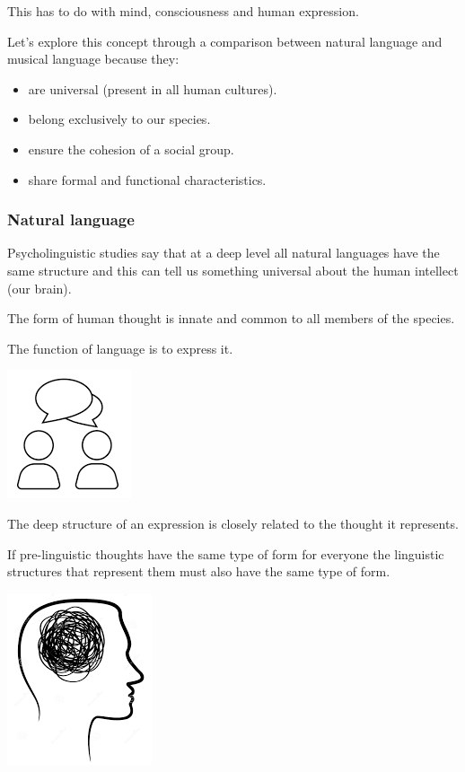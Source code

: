 This has to do with mind, consciousness and human expression.

Let's explore this concept through a comparison between natural language and musical language because they: 
\begin{itemize}
\item are universal (present in all human cultures). 
\item belong exclusively to our species. 
\item ensure the cohesion of a social group. 
\item share formal and functional characteristics.
\end{itemize}

\subsubsection{Natural language}\label{natural-language}

Psycholinguistic studies say that at a deep level all natural languages have the same structure and this can tell us something universal about the human intellect (our brain).

The form of human thought is innate and common to all members of the species.

The function of language is to express it.

\begin{center}
\includegraphics[scale=0.5]{../img/linguaggio.png}
\end{center}

The deep structure of an expression is closely related to the thought it represents.

If pre-linguistic thoughts have the same type of form for everyone the linguistic structures that represent them must also have the same type of form.

\begin{center}
\includegraphics[scale=0.4]{../img/prelinguistico.png}
\end{center}


